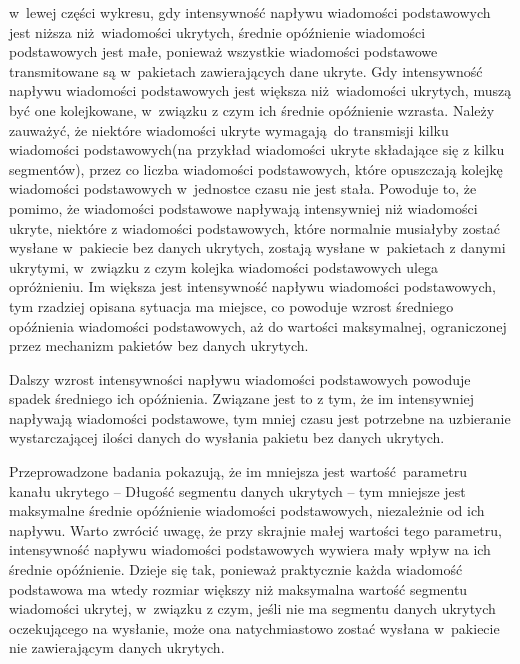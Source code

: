 \documentclass[a4paper, twoside, 12pt]{report}
\begin{document}
            w~lewej części wykresu, gdy intensywność napływu wiadomości podstawowych
            jest niższa niż wiadomości ukrytych, średnie opóźnienie wiadomości
            podstawowych jest małe, ponieważ wszystkie wiadomości podstawowe transmitowane
            są w~pakietach zawierających dane ukryte. Gdy intensywność napływu wiadomości
            podstawowych jest większa niż wiadomości ukrytych, muszą być one kolejkowane,
            w~związku z czym ich średnie opóźnienie wzrasta. Należy zauważyć, że
            niektóre wiadomości ukryte wymagają do transmisji kilku wiadomości
            podstawowych(na przykład wiadomości ukryte składające się z kilku segmentów),
            przez co liczba wiadomości podstawowych, które opuszczają kolejkę wiadomości
            podstawowych w~jednostce czasu nie jest stała. Powoduje to, że pomimo,
            że wiadomości podstawowe napływają intensywniej niż wiadomości ukryte,
            niektóre z wiadomości podstawowych, które normalnie musiałyby zostać
            wysłane w~pakiecie bez danych ukrytych, zostają wysłane w~pakietach
            z danymi ukrytymi, w~związku z czym kolejka wiadomości podstawowych
            ulega opróżnieniu. Im większa jest intensywność napływu wiadomości
            podstawowych, tym rzadziej opisana sytuacja ma miejsce, co powoduje
            wzrost średniego opóźnienia wiadomości podstawowych, aż do wartości
            maksymalnej, ograniczonej przez mechanizm pakietów bez danych ukrytych.

            Dalszy wzrost intensywności napływu wiadomości podstawowych powoduje
            spadek średniego ich opóźnienia. Związane jest to z tym, że im intensywniej
            napływają wiadomości podstawowe, tym mniej czasu jest potrzebne na uzbieranie
            wystarczającej ilości danych do wysłania pakietu bez danych ukrytych.

            Przeprowadzone badania pokazują, że im mniejsza jest wartość parametru
            kanału ukrytego -- Długość segmentu danych ukrytych -- tym mniejsze
            jest maksymalne średnie opóźnienie wiadomości podstawowych, niezależnie
            od ich napływu. Warto zwrócić uwagę, że przy skrajnie małej wartości tego
            parametru, intensywność napływu wiadomości podstawowych wywiera mały
            wpływ na ich średnie opóźnienie. Dzieje się tak, ponieważ praktycznie
            każda wiadomość podstawowa ma wtedy rozmiar większy niż maksymalna wartość
            segmentu wiadomości ukrytej, w~związku z czym, jeśli nie ma segmentu
            danych ukrytych oczekującego na wysłanie, może ona natychmiastowo
            zostać wysłana w~pakiecie nie zawierającym danych ukrytych.
\end{document}
